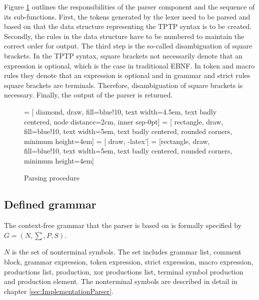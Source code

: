 Figure \ref{fig:ConceptParserFlow} outlines the responsibilities of the parser component and the sequence of its sub-functions.
First, the tokens generated by the lexer need to be parsed and based on that the data structure representing the \ac{TPTP} syntax is to be created.
Secondly, the rules in the data structure have to be numbered to maintain the correct order for output.
The third step is the so-called disambiguation of square brackets.
In the \ac{TPTP} syntax, square brackets not necessarily denote that an expression is optional, which is the case in traditional \ac{EBNF}.
In token and macro rules they denote that an expression is optional and in grammar and strict rules square brackets are terminals.
Therefore, disambiguation of square brackets is necessary.
Finally, the output of the parser is returned.
\begin{figure}[H]
 = [ diamond, draw, fill=blue!10, text width=4.5em, text badly centered, node distance=2cm, inner sep-0pt]  
 = [ rectangle, draw, fill=blue!10, text width=5em, text badly centered, rounded corners, minimum height=4em]  
 = [ draw, -latex']  
 = [rectangle, draw, fill=blue!10, text width=5em, text badly centered, rounded corners, minimum height=4em]  
\begin{center}
\end{center}
\caption{Parsing procedure}
\label{fig:ConceptParserFlow}
\end{figure}

\subsection{Defined grammar}\label{sec:ConceptParserGrammar}
The context-free grammar that the parser is based on is formally specified by $G = (N,\sum,P,S)$.

$N$ is the set of nonterminal symbols. The set includes grammar list, comment block, grammar expression, token expression, strict expression, macro expression, productions list, production, xor productions list, terminal symbol production and production element. The nonterminal symbols are described in detail in chapter \ref{sec:ImplementationParser}.


